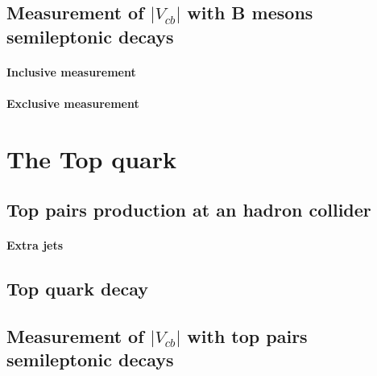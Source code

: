 \subsection{Measurement of $|V_{cb}|$ with B mesons semileptonic decays}

\paragraph*{Inclusive measurement}

\paragraph*{Exclusive measurement}


\section{The Top quark}
\subsection{Top pairs production at an hadron collider}
\paragraph*{Extra jets}
\subsection{Top quark decay}
\subsection{Measurement of $|V_{cb}|$ with top pairs semileptonic decays}